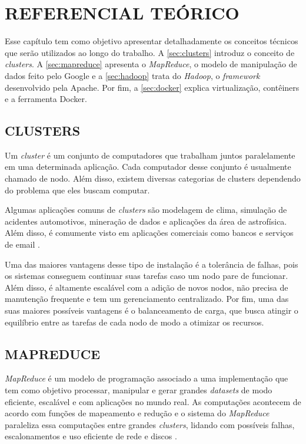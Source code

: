 \chapter{REFERENCIAL TEÓRICO} \label{cha:refteorico}

Esse capítulo tem como objetivo apresentar detalhadamente os conceitos técnicos que serão utilizados ao longo do trabalho. A \autoref{sec:clusters} introduz o conceito de \textit{clusters}. A \autoref{sec:mapreduce} apresenta o \textit{MapReduce}, o modelo de manipulação de dados feito pelo Google e a \autoref{sec:hadoop} trata do \textit{Hadoop}, o \textit{framework} desenvolvido pela Apache. Por fim, a \autoref{sec:docker} explica virtualização, contêiners e a ferramenta Docker.

\section{CLUSTERS} \label{sec:clusters}

Um \textit{cluster} é um conjunto de computadores que trabalham juntos paralelamente em uma determinada aplicação. Cada computador desse conjunto é usualmente chamado de nodo. Além disso, existem diversas categorias de clusters dependendo do problema que eles buscam computar.

Algumas aplicações comuns de \textit{clusters} são modelagem de clima, simulação de acidentes automotivos, mineração de dados e aplicações da área de astrofísica. Além disso, é comumente visto em aplicações comerciais como bancos e serviços de email \cite{ClusterGridCloudComparison11}.

Uma das maiores vantagens desse tipo de instalação é a tolerância de falhas, pois os sistemas conseguem continuar suas tarefas caso um nodo pare de funcionar. Além disso, é altamente escalável com a adição de novos nodos, não precisa de manutenção frequente e tem um gerenciamento centralizado. Por fim, uma das suas maiores possíveis vantagens é o balanceamento de carga, que busca atingir o equilíbrio entre as tarefas de cada nodo de modo a otimizar os recursos.

\section{MAPREDUCE} \label{sec:mapreduce}

\textit{MapReduce} é um modelo de programação associado a uma implementação que tem como objetivo processar, manipular e gerar grandes \textit{datasets} de modo eficiente, escalável e com aplicações no mundo real. As computações acontecem de acordo com funções de mapeamento e redução e o sistema do \textit{MapReduce} paraleliza essa computações entre grandes \textit{clusters}, lidando com possíveis falhas, escalonamentos e uso eficiente de rede e discos \cite{MapReduce08}.

